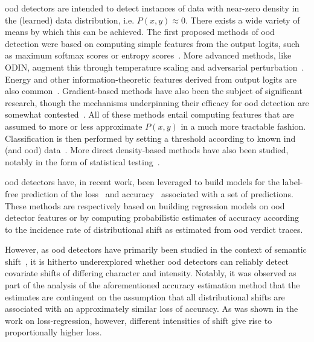 \documentclass[10pt,twocolumn,letterpaper]{article}
\begin{document}
\Gls{ood} detectors are intended to detect instances of data with near-zero density in the (learned) data distribution, i.e. \(P(x,y)\approx0\). There exists a wide variety of means by which this can be achieved. The first proposed methods of \gls{ood} detection were based on computing simple features from the output logits, such as maximum softmax scores or entropy scores~\cite{dsd_baseline}. More advanced methods, like ODIN, augment this through temperature scaling and adversarial perturbation~\cite{odin}. Energy and other information-theoretic features derived from output logits are also common~\cite{dsd_energy}. Gradient-based methods have also been the subject of significant research, though the mechanisms underpinning their efficacy for \gls{ood} detection are somewhat contested~\cite{gradients_distshift, gradients_distshift_2, gradients_distshift_3}. All of these methods entail computing features that are assumed to more or less approximate \(P(x,y)\) in a much more tractable fashion. Classification is then performed by setting a threshold according to known \gls{ind} (and \gls{ood}) data~\cite{dsd_survey}. More direct density-based methods have also been studied, notably in the form of statistical testing~\cite{combined_dsd, typicality_dsd, failing_loudly}. 

\Gls{ood} detectors have, in recent work, been leveraged to build models for the label-free prediction of the loss~\cite{rv_lossregression} and accuracy~\cite{acm_pra} associated with a set of predictions. These methods are respectively based on building regression models on \gls{ood} detector features or by computing probabilistic estimates of accuracy according to the incidence rate of distributional shift as estimated from \gls{ood} verdict traces. 

However, as \Gls{ood} detectors have primarily been studied in the context of semantic shift~\cite{dsd_benchmarking, dsd_survey}, it is hitherto underexplored whether \gls{ood} detectors can reliably detect covariate shifts of differing character and intensity. Notably, it was observed as part of the analysis of the aforementioned accuracy estimation method that the estimates are contingent on the assumption that all distributional shifts are associated with an approximately similar loss of accuracy. As was shown in the work on loss-regression, however, different intensities of shift give rise to proportionally higher loss. 
\end{document}
